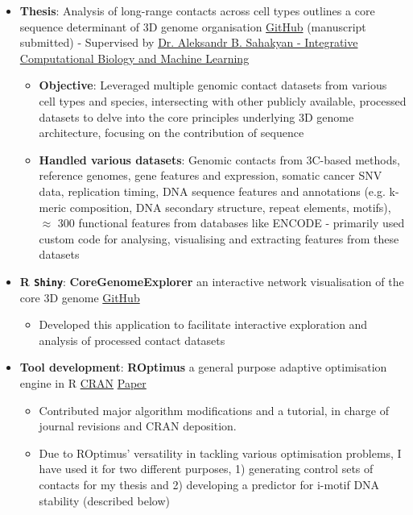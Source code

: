 \documentclass[legalpaper,11pt]{article}
\newcommand{\resumeItem}[2]{
  \item\small{
    \textbf{#1}{: #2 \vspace{-2pt}}
  }
}
\newcommand{\resumeItemListStart}{\begin{itemize}}
\newcommand{\resumeItemListEnd}{\end{itemize}\vspace{-5pt}}
\begin{document}
            \resumeItemListStart
                \resumeItem{Thesis}{Analysis of long-range contacts across cell types outlines a core sequence determinant of 3D genome organisation \href{https://github.com/SahakyanLab/GenomicContactDynamics}{GitHub} (manuscript submitted) - Supervised by \href{https://www.imm.ox.ac.uk/research/research-groups/sahakyan-group-integrative-computational-biology-and-machine-learning}{Dr. Aleksandr B. Sahakyan - Integrative Computational Biology and Machine Learning}}
                    \begin{itemize}
                        \resumeItem {Objective}{Leveraged multiple genomic contact datasets from various cell types and species, intersecting with other publicly available, processed datasets to delve into the core principles underlying 3D genome architecture, focusing on the contribution of sequence}
                        \resumeItem {Handled various datasets}{Genomic contacts from 3C-based methods, reference genomes, gene features and expression, somatic cancer SNV data, replication timing, DNA sequence features and annotations (e.g. k-meric composition, DNA secondary structure, repeat elements, motifs), $\approx$ 300 functional features from databases like ENCODE - primarily used custom code for analysing, visualising and extracting features from these datasets}
                    \end{itemize}
            \resumeItemListEnd

            \resumeItemListStart
                \resumeItem{R \texttt{Shiny}}{\textbf{CoreGenomeExplorer} an interactive network visualisation of the core 3D genome \href{https://github.com/SahakyanLab/CoreGenomeExplorer/tree/master}{GitHub}}
                    \begin{itemize}
                        \item {Developed this application to facilitate interactive exploration and analysis of processed contact datasets}
                    \end{itemize}
            \resumeItemListEnd
            
            \resumeItemListStart
                \resumeItem{Tool development}{\textbf{ROptimus} a general purpose adaptive optimisation engine in R \href{https://cran.r-project.org/web/packages/ROptimus/index.html}{CRAN} \href{https://academic.oup.com/bioinformatics/article/39/5/btad292/7152277}{Paper}}
                    \begin{itemize}
                        \item {Contributed major algorithm modifications and a tutorial, in charge of journal revisions and CRAN deposition.}
                        \item {Due to ROptimus' versatility in tackling various optimisation problems, I have used it for two different purposes, 1) generating control sets of contacts for my thesis and 2) developing a predictor for i-motif DNA stability (described below)}
                    \end{itemize}
            \resumeItemListEnd
            
\end{document}
